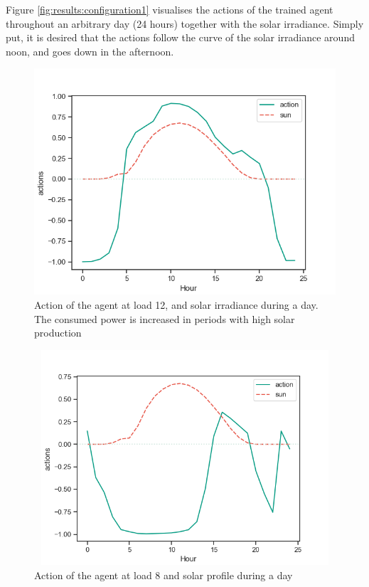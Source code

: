 \documentclass[class=book, crop=false, 11pt]{standalone}
\begin{document}
Figure \ref{fig:results:configuration1} visualises the actions of the trained agent throughout an arbitrary day (24 hours) together with the solar irradiance. Simply put, it is desired that the actions follow the curve of the solar irradiance around noon, and goes down in the afternoon. 

\begin{figure}[h]
    \center
\includegraphics[scale=0.7]{figures/configuration1_follows_sun.png}
    \caption[size = 9]{Action of the agent at load 12, and solar irradiance during a day. The consumed power is increased in periods with high solar production}
    \label{fig:results:configuration1_follows_sun}
\end{figure}

\begin{figure}[h]
    \center
\includegraphics[height=8cm, width=12cm]{figures/configuration1_negative_actions.png}
    \caption[size = 9]{Action of the agent at load 8 and solar profile during a day}
    \label{fig:results:configuration1_negative_actions}
\end{figure}
\end{document}

